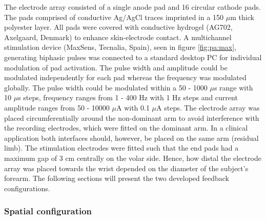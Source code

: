 The electrode array consisted of a single anode pad and 16 circular cathode pads. The pads comprised of conductive Ag/AgCl traces imprinted in a 150 $\mu$m thick polyester layer. All pads were covered with conductive hydrogel (AG702, Axelgaard, Denmark) to enhance skin-electrode contact.  A multichannel stimulation device (MaxSens, Tecnalia, Spain), seen in figure \ref{fig:pa:max}, generating biphasic pulses was connected to a standard desktop PC for individual modulation of pad activation. The pulse width and amplitude could be modulated independently for each pad whereas the frequency was modulated globally. The pulse width could be modulated within a 50 - 1000 $\mu $s range with 10 $\mu $s steps, frequency ranges from 1 - 400 Hz with 1 Hz steps and current amplitude ranges from 50 - 10000 $\mu $A with 0.1 $\mu $A steps. The electrode array was placed circumferentially around the non-dominant arm to avoid interference with the recording electrodes, which were fitted on the dominant arm. In a clinical application both interfaces should, however, be placed on the same arm (residual limb). The stimulation electrodes were fitted such that the end pads had a maximum gap of 3 cm centrally on the volar side. Hence, how distal the electrode array was placed towards the wrist depended on the diameter of the subject's forearm. The following sections will present the two developed feedback configurations. 

\vspace{0.3cm}
\subsubsection{Spatial configuration}

